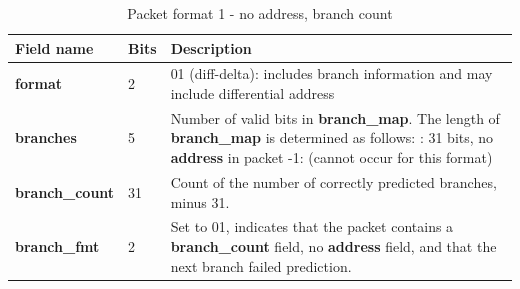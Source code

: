\begin{table}[htp]
  \centering
  \caption{Packet format 1 - no address, branch count}
  \label{tab:te_inst0-1-noaddr-count}
  \begin{tabulary}{\textwidth}{|l|p{35mm}|p{90mm}|}
    \hline
    {\bf Field name} & {\bf Bits} & {\bf Description} \\
    \hline
    \textbf{format}	& 2	& 01 (diff-delta): includes branch information and may include differential address\\
    \hline
    \textbf{branches} & 5 & Number of valid bits in \textbf{branch\_map}. The length of \textbf{branch\_map} is determined as follows: :    31 bits, no \textbf{address} in packet -1: (cannot occur for this format) \\
    \hline
    \textbf{branch\_count} & 31 & Count of the number of correctly predicted branches, minus 31. \\
    \hline
    \textbf{branch\_fmt} & 2 & Set to 01, indicates that the packet contains a \textbf{branch\_count} field, no
    \textbf{address} field, and that the next branch failed prediction. \\
    \hline
  \end{tabulary}
\end{table}

